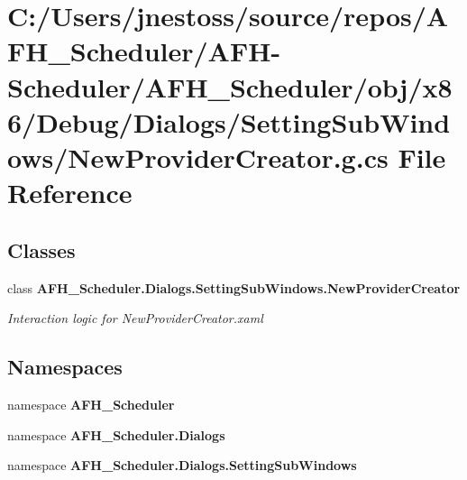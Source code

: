 \section{C\+:/\+Users/jnestoss/source/repos/\+A\+F\+H\+\_\+\+Scheduler/\+A\+F\+H-\/\+Scheduler/\+A\+F\+H\+\_\+\+Scheduler/obj/x86/\+Debug/\+Dialogs/\+Setting\+Sub\+Windows/\+New\+Provider\+Creator.g.\+cs File Reference}
\label{x86_2_debug_2_dialogs_2_setting_sub_windows_2_new_provider_creator_8g_8cs}
\subsection*{Classes}
\begin{DoxyCompactItemize}
\item 
class \textbf{ A\+F\+H\+\_\+\+Scheduler.\+Dialogs.\+Setting\+Sub\+Windows.\+New\+Provider\+Creator}
\begin{DoxyCompactList}\small\item\em Interaction logic for New\+Provider\+Creator.\+xaml \end{DoxyCompactList}\end{DoxyCompactItemize}
\subsection*{Namespaces}
\begin{DoxyCompactItemize}
\item 
namespace \textbf{ A\+F\+H\+\_\+\+Scheduler}
\item 
namespace \textbf{ A\+F\+H\+\_\+\+Scheduler.\+Dialogs}
\item 
namespace \textbf{ A\+F\+H\+\_\+\+Scheduler.\+Dialogs.\+Setting\+Sub\+Windows}
\end{DoxyCompactItemize}
